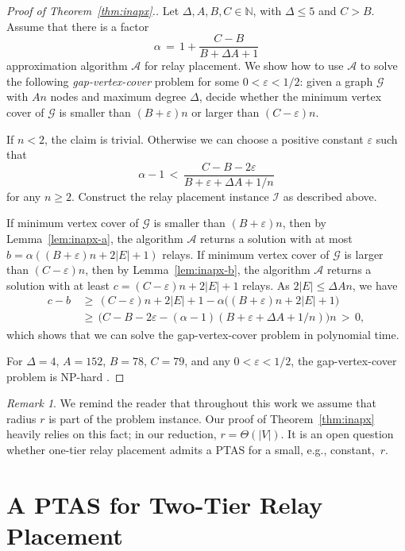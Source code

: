 \documentclass[11pt,a4paper]{article}
\newcommand{\s}[1]{{\lvert #1 \rvert}}
\newcommand{\eps}{\varepsilon}
\newcommand{\myG}{\mathcal{G}}
\newcommand{\myI}{\mathcal{I}}
\newcommand{\myA}{\mathcal{A}}
\theoremstyle{definition}
\theoremstyle{remark}
\newtheorem{remark}{Remark}
\begin{document}
\begin{proof}[Proof of Theorem~\ref{thm:inapx}.]
Let $\Delta, A, B, C \in \mathbb{N}$, with $\Delta \le 5$ and $C > B$. Assume that there is a factor
\[
    \alpha \,=\, 1 + \frac{C-B}{B + \Delta A + 1}
\]
approximation algorithm $\myA$ for relay placement. We show how to use $\myA$ to solve the following \emph{gap-vertex-cover} problem for some $0 < \eps < 1/2$: given a graph $\myG$ with $A n$ nodes and maximum degree $\Delta$, decide whether the minimum vertex cover of $\myG$ is smaller than $(B+\eps)n$ or larger than $(C-\eps)n$.

If $n < 2$, the claim is trivial. Otherwise we can choose a positive constant $\eps$ such that
\[
    \alpha - 1 \,<\, \frac{C-B-2\eps}{B +\eps + \Delta A+1/n}
\]
for any $n \ge 2$. Construct the relay placement instance $\myI$ as described above.

If minimum vertex cover of $\myG$ is smaller than $(B+\eps)n$, then by Lemma~\ref{lem:inapx-a}, the algorithm $\myA$ returns a solution with at most
$b = {\alpha ((B+\eps)n + 2\s{E} + 1)}$
relays. If minimum vertex cover of $\myG$ is larger than $(C-\eps)n$, then by Lemma~\ref{lem:inapx-b}, the algorithm $\myA$ returns a solution with at least
$c = (C-\eps)n + 2\s{E} + 1$
relays. As $2\s{E} \le \Delta A n$, we have
\[
    \begin{split}
    c - b
    &\,\ge\, (C-\eps)n + 2\s{E} + 1 - \alpha \bigl((B+\eps)n + 2\s{E} + 1\bigr) \\
    &\,\ge\, \bigl(C - B - 2 \eps - (\alpha-1)(B+ \eps + \Delta A + 1/n)\bigr) n
    \,>\, 0,
    \end{split}
\]
which shows that we can solve the gap-vertex-cover problem in polynomial time.

For $\Delta = 4$, $A = 152$, $B = 78$, $C = 79$, and any $0 < \eps < 1/2$, the gap-vertex-cover problem is NP-hard \cite[Theorem~3]{berman99some}.
\end{proof}

\begin{remark}
    We remind the reader that throughout this work we assume that radius $r$ is part of the problem instance. Our proof of Theorem~\ref{thm:inapx} heavily relies on this fact; in our reduction, $r = \Theta(\s{V})$. It is an open question whether one-tier relay placement admits a PTAS for a small, e.g., constant,~$r$.
\end{remark}



\section{A PTAS for Two-Tier Relay Placement}\label{sec_ptas}
\end{document}

